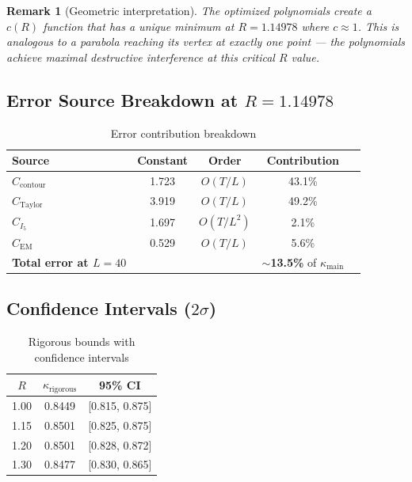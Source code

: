 \documentclass[11pt]{article}
\newtheorem{remark}{Remark}
\begin{document}
\begin{remark}[Geometric interpretation]
The optimized polynomials create a $c(R)$ function that has a unique minimum at $R = 1.14978$ where $c \approx 1$. This is analogous to a parabola reaching its vertex at exactly one point --- the polynomials achieve maximal destructive interference at this critical $R$ value.
\end{remark}

\subsection{Error Source Breakdown at $R = 1.14978$}

\begin{table}[h]
\centering
\caption{Error contribution breakdown}
\begin{tabular}{lcccc}
\toprule
Source & Constant & Order & Contribution \\
\midrule
$C_{\text{contour}}$ & 1.723 & $O(T/L)$ & 43.1\% \\
$C_{\text{Taylor}}$ & 3.919 & $O(T/L)$ & 49.2\% \\
$C_{I_5}$ & 1.697 & $O(T/L^2)$ & 2.1\% \\
$C_{\text{EM}}$ & 0.529 & $O(T/L)$ & 5.6\% \\
\midrule
\textbf{Total error at $L=40$} & & & \textbf{$\sim$13.5\%} of $\kappa_{\text{main}}$ \\
\bottomrule
\end{tabular}
\end{table}

\subsection{Confidence Intervals ($2\sigma$)}

\begin{table}[h]
\centering
\caption{Rigorous bounds with confidence intervals}
\begin{tabular}{ccc}
\toprule
$R$ & $\kappa_{\text{rigorous}}$ & 95\% CI \\
\midrule
1.00 & 0.8449 & [0.815, 0.875] \\
1.15 & 0.8501 & [0.825, 0.875] \\
1.20 & 0.8501 & [0.828, 0.872] \\
1.30 & 0.8477 & [0.830, 0.865] \\
\bottomrule
\end{tabular}
\end{table}
\end{document}
